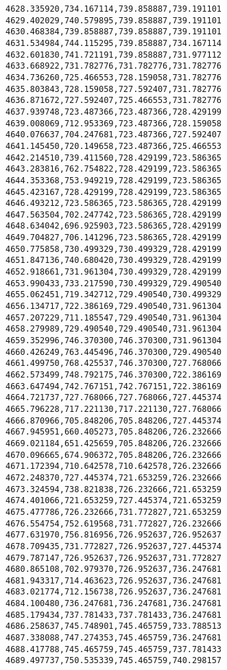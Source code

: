 \documentclass[11pt]{article}
\begin{document}
\begin{Verbatim}[commandchars=\\\{\}]
4628.335920,734.167114,739.858887,739.191101
4629.402029,740.579895,739.858887,739.191101
4630.468384,739.858887,739.858887,739.191101
4631.534984,744.115295,739.858887,734.167114
4632.601830,741.721191,739.858887,731.977112
4633.668922,731.782776,731.782776,731.782776
4634.736260,725.466553,728.159058,731.782776
4635.803843,728.159058,727.592407,731.782776
4636.871672,727.592407,725.466553,731.782776
4637.939748,723.487366,723.487366,728.429199
4639.008069,712.953369,723.487366,728.159058
4640.076637,704.247681,723.487366,727.592407
4641.145450,720.149658,723.487366,725.466553
4642.214510,739.411560,728.429199,723.586365
4643.283816,762.754822,728.429199,723.586365
4644.353368,753.949219,728.429199,723.586365
4645.423167,728.429199,728.429199,723.586365
4646.493212,723.586365,723.586365,728.429199
4647.563504,702.247742,723.586365,728.429199
4648.634042,696.925903,723.586365,728.429199
4649.704827,706.141296,723.586365,728.429199
4650.775858,730.499329,730.499329,728.429199
4651.847136,740.680420,730.499329,728.429199
4652.918661,731.961304,730.499329,728.429199
4653.990433,733.217590,730.499329,729.490540
4655.062451,719.342712,729.490540,730.499329
4656.134717,722.386169,729.490540,731.961304
4657.207229,711.185547,729.490540,731.961304
4658.279989,729.490540,729.490540,731.961304
4659.352996,746.370300,746.370300,731.961304
4660.426249,763.445496,746.370300,729.490540
4661.499750,768.425537,746.370300,727.768066
4662.573499,748.792175,746.370300,722.386169
4663.647494,742.767151,742.767151,722.386169
4664.721737,727.768066,727.768066,727.445374
4665.796228,717.221130,717.221130,727.768066
4666.870966,705.848206,705.848206,727.445374
4667.945951,660.405273,705.848206,726.232666
4669.021184,651.425659,705.848206,726.232666
4670.096665,674.906372,705.848206,726.232666
4671.172394,710.642578,710.642578,726.232666
4672.248370,727.445374,721.653259,726.232666
4673.324594,738.821838,726.232666,721.653259
4674.401066,721.653259,727.445374,721.653259
4675.477786,726.232666,731.772827,721.653259
4676.554754,752.619568,731.772827,726.232666
4677.631970,756.816956,726.952637,726.952637
4678.709435,731.772827,726.952637,727.445374
4679.787147,726.952637,726.952637,731.772827
4680.865108,702.979370,726.952637,736.247681
4681.943317,714.463623,726.952637,736.247681
4683.021774,712.156738,726.952637,736.247681
4684.100480,736.247681,736.247681,736.247681
4685.179434,737.781433,737.781433,736.247681
4686.258637,745.748901,745.465759,733.788513
4687.338088,747.274353,745.465759,736.247681
4688.417788,745.465759,745.465759,737.781433
4689.497737,750.535339,745.465759,740.298157

\end{Verbatim}
\end{document}
